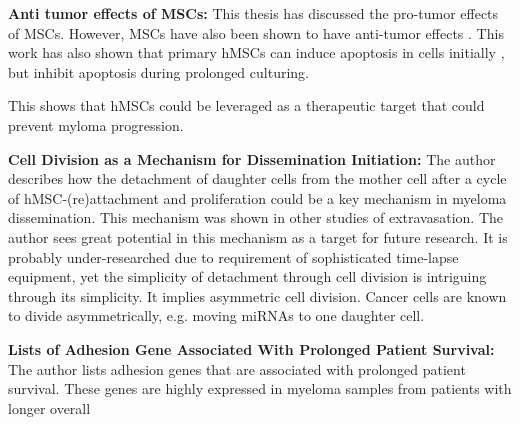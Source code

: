 \textbf{Anti tumor effects of MSCs:}
This thesis has discussed the pro-tumor effects of MSCs. However, MSCs have also
been shown to have anti-tumor effects \cite{galderisiMyelomaCellsCan2015}. This
work has also shown that primary \acp{hMSC} can induce apoptosis in  cells
initially ,
but inhibit apoptosis during prolonged culturing.

This shows that hMSCs could be leveraged
as a therapeutic target that could prevent myloma progression.




\textbf{Cell Division as a Mechanism for Dissemination Initiation:}
The author describes how the detachment of daughter cells from the mother cell
after a cycle of hMSC-(re)attachment and proliferation could be a key mechanism
in myeloma dissemination. This mechanism was shown in other studies of
extravasation. The author sees great potential in this mechanism as a target for
future research. It is probably under-researched due to requirement of
sophisticated time-lapse equipment, yet the simplicity of detachment through
cell division is intriguing through its simplicity. It implies asymmetric cell
division. Cancer cells are known to divide asymmetrically, e.g. moving miRNAs to
one daughter cell.








\textbf{Lists of Adhesion Gene Associated With Prolonged Patient Survival:}
The author lists adhesion genes that are associated with prolonged patient
survival. These genes are highly expressed in myeloma samples from patients with
longer overall

